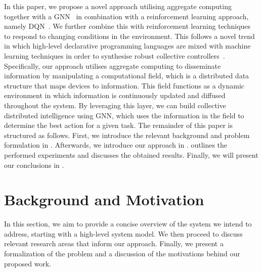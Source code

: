 \documentclass[conference]{IEEEtran}
\begin{document}
In this paper, we propose a novel approach utilising aggregate computing~\cite{Beal2015Computer} together with a \ac{GNN}~\cite{Zhou2020AIOpen} in combination with a reinforcement learning approach, namely \ac{DQN}~\cite{mnih2015human}. 
We further combine this with reinforcement learning techniques to respond to changing conditions in the environment. 
%
This follows a novel trend in which high-level declarative programming languages are mixed with machine learning techniques in order to synthesise robust collective controllers~\cite{DBLP:conf/acsos/Aguzzi21,DBLP:conf/icdcs/AguzziCV22,DBLP:conf/coordination/AguzziCV22}.
Specifically, 
 our approach utilises aggregate computing to disseminate information by manipulating a computational field, 
 which is a distributed data structure that maps devices to information. 
 This field functions as a dynamic environment in which information is continuously updated and diffused throughout the system. 
 By leveraging this layer, we can build collective distributed intelligence using \ac{GNN},
  which uses the information in the field to determine the best action for a given task.
The remainder of this paper is structured as follows. First, we introduce the relevant background and problem formulation in . Afterwards, we introduce our approach in .  outlines the performed experiments and discusses the obtained results. Finally, we will present our conclusions in .

\section{Background and Motivation}
\label{sec:background}
In this section, we aim to provide a concise overview of the system we intend to address, 
 starting with a high-level system model. 
%
We then proceed to discuss relevant research areas that inform our approach. 
%
Finally, we present a formalization of the problem and a discussion of the motivations behind our proposed work.
\end{document}
